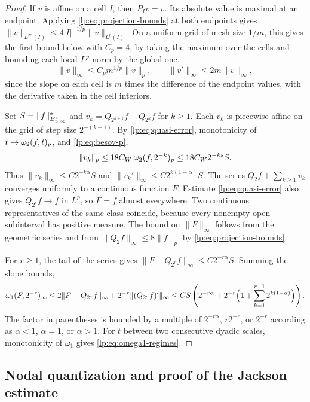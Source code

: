 \documentclass[11pt,a4paper]{article}
\begin{document}
\begin{proof}
If $v$ is affine on a cell $I$, then $P_Iv=v$. Its absolute value is maximal at an endpoint. Applying \eqref{lp:eq:projection-bounds} at both endpoints gives $\|v\|_{L^\infty(I)}\le4|I|^{-1/p}\|v\|_{L^p(I)}$. On a uniform grid of mesh size $1/m$, this gives the first bound below with $C_p=4$, by taking the maximum over the cells and bounding each local $L^p$ norm by the global one.
\begin{equation}
 \|v\|_\infty\le C_p m^{1/p}\|v\|_p,\qquad \|v'\|_\infty\le2m\|v\|_\infty,
 \label{lp:eq:nikolskii}
\end{equation}
since the slope on each cell is $m$ times the difference of the endpoint values, with the derivative taken in the cell interiors.

Set $S=\|f\|^*_{B^{s}_{p,\infty}}$ and $v_k=Q_{2^{k+1}}f-Q_{2^k}f$ for $k\ge1$. Each $v_k$ is piecewise affine on the grid of step size $2^{-(k+1)}$. By \eqref{lp:eq:quasi-error}, monotonicity of $t\mapsto\omega_2(f,t)_{p}$, and \eqref{lp:eq:besov-p},
\[
 \|v_k\|_p\le18C_W\,\omega_2(f,2^{-k})_{p}\le18C_W 2^{-ks}S.
\]
Thus $\|v_k\|_\infty\le C2^{-k\alpha}S$ and $\|v_k'\|_\infty\le C2^{k(1-\alpha)}S$. The series $Q_2f+\sum_{k\ge1}v_k$ converges uniformly to a continuous function $F$. Estimate \eqref{lp:eq:quasi-error} also gives $Q_{2^r}f\to f$ in $L^p$, so $F=f$ almost everywhere. Two continuous representatives of the same class coincide, because every nonempty open subinterval has positive measure. The bound on $\|F\|_\infty$ follows from the geometric series and from $\|Q_2f\|_\infty\le8\|f\|_p$ by \eqref{lp:eq:projection-bounds}.

For $r\ge1$, the tail of the series gives $\|F-Q_{2^r}f\|_\infty\le C2^{-r\alpha}S$. Summing the slope bounds,
\[
 \omega_1(F,2^{-r})_\infty
 \le 2\|F-Q_{2^r}f\|_\infty+2^{-r}\|(Q_{2^r}f)'\|_\infty
 \le CS\left(2^{-r\alpha}+2^{-r}\Bigl(1+\sum_{k=1}^{r-1}2^{k(1-\alpha)}\Bigr)\right).
\]
The factor in parentheses is bounded by a multiple of $2^{-r\alpha}$, $r2^{-r}$, or $2^{-r}$ according as $\alpha<1$, $\alpha=1$, or $\alpha>1$. For $t$ between two consecutive dyadic scales, monotonicity of $\omega_1$ gives \eqref{lp:eq:omega1-regimes}.
\end{proof}

\subsection{Nodal quantization and proof of the Jackson estimate}
\end{document}
